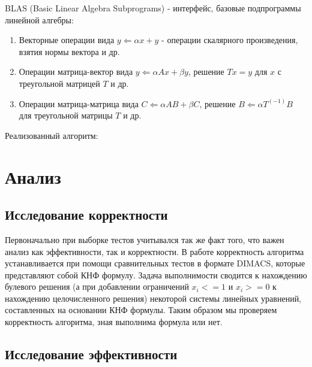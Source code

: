 \documentclass[a4paper,14pt,russian]{extreport}
\begin{document}
\par BLAS (Basic Linear Algebra Subprograms) - интерфейс, базовые подпрограммы линейной алгебры:
  \begin{enumerate}
  \item Векторные операции вида $y\Leftarrow\alpha x + y$ - операции скалярного произведения, взятия нормы вектора и др.
  \item Операции матрица-вектор вида $y\Leftarrow\alpha Ax + \beta y$, решение $Tx = y$ для $x$ с треугольной матрицей $T$ и др.
  \item Операции матрица-матрица вида $C\Leftarrow \alpha AB + \beta C$, решение $B\Leftarrow \alpha T^(-1)B$ для треугольной матрицы $T$ и др.
  \end{enumerate}
\par Реализованный алгоритм:

 

\chapter{Анализ}

\section{Исследование корректности}

Первоначально при выборке тестов учитывался так же факт того, что важен анализ как эффективности, так и корректности. В работе корректность алгоритма устанавливается при помощи сравнительных тестов в формате DIMACS, которые представляют собой КНФ формулу. Задача выполнимости сводится к нахождению булевого решения (а при добавлении ограничений $x_i <= 1$ и $x_i >= 0$ к нахождению целочисленного решения) некоторой системы линейных уравнений, составленных на основании КНФ формулы. Таким образом мы проверяем корректность алгоритма, зная выполнима формула или нет.


\section{Исследование эффективности}
\end{document}
